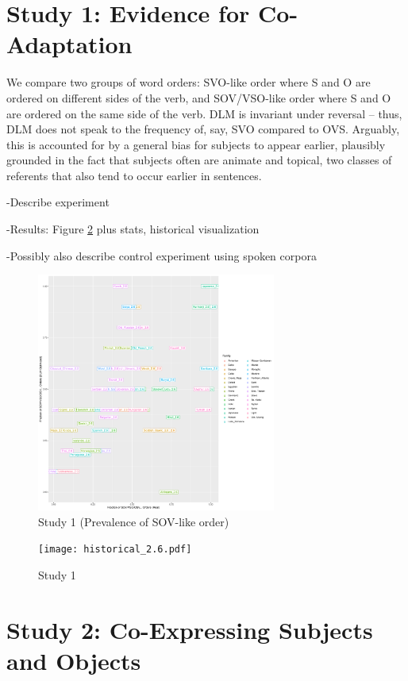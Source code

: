 \documentclass[11pt,a4paper]{article}
\begin{document}
\section{Study 1: Evidence for Co-Adaptation}

We compare two groups of word orders: SVO-like order where S and O are ordered on different sides of the verb, and SOV/VSO-like order where S and O are ordered on the same side of the verb.
DLM is invariant under reversal -- thus, DLM does not speak to the frequency of, say, SVO compared to OVS.
Arguably, this is accounted for by a general bias for subjects to appear earlier, plausibly grounded in the fact that subjects often are animate and topical, two classes of referents that also tend to occur earlier in sentences.

-Describe experiment


-Results: Figure \ref{fig:study1} plus stats, historical visualization


-Possibly also describe control experiment using spoken corpora

\begin{figure}
    \centering
    \includegraphics[width=0.7\textwidth]{figures/fracion-optimized_DLM_2.6.pdf}
    \caption{Study 1 (Prevalence of SOV-like order)}
    \label{fig:study1}
\end{figure}


\begin{figure}
    \centering
    \texttt{[image: historical\_2.6.pdf]}
    \caption{Study 1}
    \label{fig:study1}
\end{figure}




\section{Study 2: Co-Expressing Subjects and Objects}
\end{document}
